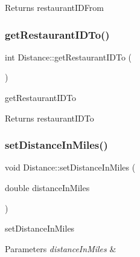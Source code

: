 \begin{DoxyReturn}{Returns}
restaurant\+I\+D\+From 
\end{DoxyReturn}
\mbox{\label{class_distance_ad523bb34afe88d178a1cb494220244bb}} 
\subsubsection{\texorpdfstring{get\+Restaurant\+I\+D\+To()}{getRestaurantIDTo()}}
{\footnotesize\ttfamily int Distance\+::get\+Restaurant\+I\+D\+To (\begin{DoxyParamCaption}{ }\end{DoxyParamCaption})}



get\+Restaurant\+I\+D\+To 

\begin{DoxyReturn}{Returns}
restaurant\+I\+D\+To 
\end{DoxyReturn}
\mbox{\label{class_distance_a2bbd9bef5a6f0692aa1b4d8b5ce9344f}} 
\subsubsection{\texorpdfstring{set\+Distance\+In\+Miles()}{setDistanceInMiles()}}
{\footnotesize\ttfamily void Distance\+::set\+Distance\+In\+Miles (\begin{DoxyParamCaption}\item[{double}]{distance\+In\+Miles }\end{DoxyParamCaption})}



set\+Distance\+In\+Miles 


\begin{DoxyParams}{Parameters}
{\em distance\+In\+Miles} & \\
\hline
\end{DoxyParams}
\mbox{\label{class_distance_ae91858d0705925be8f96d586844697ec}} 
